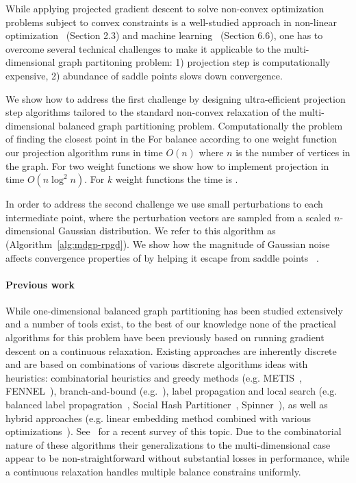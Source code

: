 While applying projected gradient descent to solve  non-convex optimization problems subject to convex constraints is a well-studied approach in non-linear optimization~\cite{B99} (Section 2.3) and machine learning~\cite{JK17} (Section 6.6), one has to overcome several technical challenges to make it applicable to the multi-dimensional graph partitoning problem: 1) projection step is computationally expensive, 2) abundance of saddle points slows down convergence.

We show how to address the first challenge by designing ultra-efficient projection step algorithms tailored to the standard non-convex relaxation of the multi-dimensional balanced graph partitioning problem. Computationally the problem of finding the closest point in the 
 For balance according to one weight function our projection algorithm runs in time $O(n)$ where $n$ is the number of vertices in the graph. For two weight functions we show how to implement projection in time $O(n \log^2 n)$. For $k$ weight functions the time is .

In order to address the second challenge we use small perturbations to each intermediate point, where the perturbation vectors are sampled from a scaled $n$-dimensional Gaussian distribution.  We refer to this algorithm as \algname (Algorithm~\ref{alg:mdgp-rpgd}).
We show how the magnitude of Gaussian noise affects convergence properties of \algname by helping it escape from saddle points~\cite{} .



\paragraph{Previous work}

While one-dimensional balanced graph partitioning has been studied extensively and a number of tools exist, to the best of our knowledge none of the practical algorithms for this problem have been previously based on running gradient descent on a continuous relaxation.
Existing approaches are inherently discrete and are based on combinations of various discrete algorithms ideas with heuristics: combinatorial heuristics and greedy methods (e.g. METIS~\cite{KK95}, FENNEL~\cite{TGRV14}), branch-and-bound (e.g.~\cite{DGRW12}), label propagation and local search (e.g. balanced label propagration~\cite{UB13}, Social Hash Partitioner~\cite{KKPPSAP17}, Spinner~\cite{MLLS17}), as well as hybrid approaches (e.g. linear embedding method combined with various optimizations~\cite{ABM16}). See~\cite{BMSSS16} for a recent survey of this topic. Due to the combinatorial nature of these algorithms their generalizations to the multi-dimensional case appear to be non-straightforward without substantial losses in performance, while a continuous relaxation handles multiple balance constrains uniformly.


